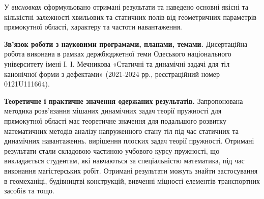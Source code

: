 У \textit{висновках}
сформульовано отримані результати та наведено основні якісні та кількістні залежності хвильових та статичних полів
від геометричних параметрів прямокутної області, характеру та частоти навантаження.

\textbf{Зв’язок роботи з науковими програмами, планами, темами.}
Дисертаційна робота виконана в рамках держбюджетної теми Одеського національного університету імені І. І. Мечникова
«Статичні та динамічні задачі для тіл канонічної форми з дефектами»
(2021-2024 рр., реєстраційний номер 0121U111664).

\textbf{Теоретичне і практичне значення одержаних результатів.} 
Запропонована методика розв'язання мішаних динамічних задач теорії пружності для прямокутної області має теоретичне значення для подальшого розвитку математичних методів аналізу напруженного стану тіл під час статичних та динамічних навантаженнь. вирішення плоских задач теорії пружності.
Отримані результати стали складовою частиною учбового курсу   пружності\frqq, що викладається студентам, які навчаються за спеціальністю  математика\frqq, під час виконання магістерських робіт.
Отримані результати можуть знайти застосування в геомеханіці, будівництві конструкцій, вивченні міцності елементів транспортних засобів та тощо.
